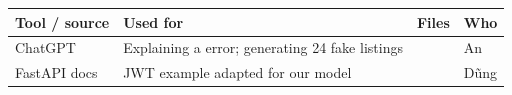 \documentclass[11pt,a4paper]{article}
\newenvironment{example}{\begin{examplebox}}{\end{examplebox}}
\begin{document}
\begin{example}
\footnotesize
\begin{tabularx}{\linewidth}{@{}l Y l l@{}}
\toprule
Tool / source & Used for & Files & Who \\
\midrule
ChatGPT & Explaining a  error; generating 24 fake listings &  & An \\
FastAPI docs & JWT example adapted for our  model &  & Dũng \\
\bottomrule
\end{tabularx}
\end{example}
\end{document}
